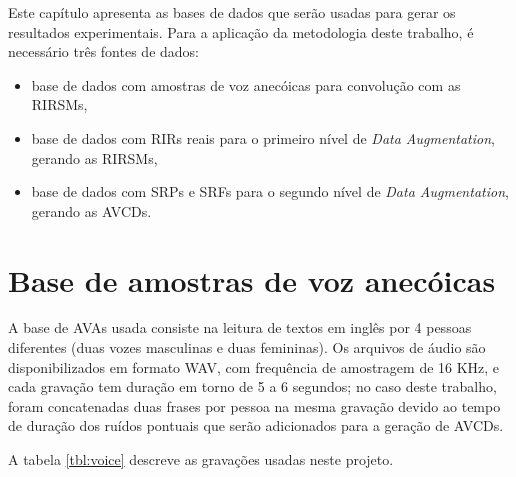 Este capítulo apresenta as bases de dados que serão usadas para gerar os resultados experimentais.
Para a aplicação da metodologia deste trabalho, é necessário três fontes de dados:

\begin{itemize}
    \item base de dados com amostras de voz anecóicas para convolução com as RIRSMs,
    \item base de dados com RIRs reais para o primeiro nível de \textit{Data Augmentation}, gerando as RIRSMs,
    \item base de dados com SRPs e SRFs para o segundo nível de \textit{Data Augmentation}, gerando as AVCDs.
\end{itemize}


\section{Base de amostras de voz anecóicas}

A base de AVAs usada consiste na leitura de textos em inglês por 4 pessoas diferentes (duas vozes masculinas e duas femininas).
Os arquivos de áudio são disponibilizados em formato WAV, com frequência de amostragem de 16 KHz, e cada gravação tem duração
em torno de 5 a 6 segundos; no caso deste trabalho, foram concatenadas duas frases por pessoa na mesma 
gravação devido ao tempo de duração dos ruídos pontuais que serão adicionados para a geração de AVCDs.

A tabela \ref{tbl:voice} descreve as gravações usadas neste projeto.

